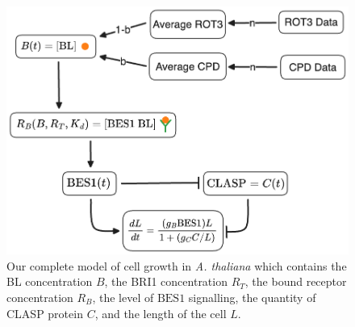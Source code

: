 \begin{figure}
    \centering
    \includegraphics[width=13cm]{img/clasp1-model.png}
    \caption{Our complete model of cell growth in \emph{A. thaliana} which contains the BL concentration $B$, the BRI1 concentration $R_{T}$, the bound receptor concentration $R_{B}$, the level of $\text{BES1}$ signalling, the quantity of CLASP protein $C$, and the length of the cell $L$.}
    \label{fig:clasp1-model}
\end{figure}


